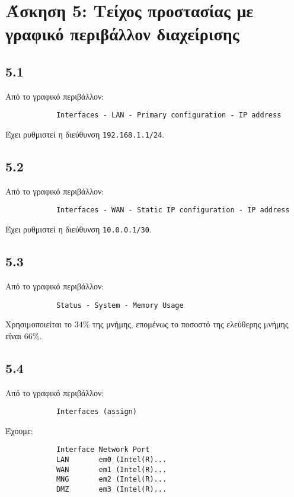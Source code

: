 \documentclass[a4paper, 12pt]{article}
\begin{document}
\section*{Άσκηση 5: Τείχος προστασίας με γραφικό περιβάλλον διαχείρισης}

	\subsection*{5.1}
		Από το γραφικό περιβάλλον:
		
		\begin{verbatim}
			Interfaces - LAN - Primary configuration - IP address 
		\end{verbatim}
		
		Έχει ρυθμιστεί η διεύθυνση \verb|192.168.1.1/24|.

	\subsection*{5.2}
		Από το γραφικό περιβάλλον:
		
		\begin{verbatim}
			Interfaces - WAN - Static IP configuration - IP address
		\end{verbatim}
		
		Έχει ρυθμιστεί η διεύθυνση \verb|10.0.0.1/30|.

	\subsection*{5.3}
		Από το γραφικό περιβάλλον:
		
		\begin{verbatim}
			Status - System - Memory Usage
		\end{verbatim}
		
		Χρησιμοποιείται το 34\% της μνήμης, επομένως το ποσοστό της ελεύθερης μνήμης είναι 66\%.

	\subsection*{5.4}
		Από το γραφικό περιβάλλον:
		
		\begin{verbatim}
			Interfaces (assign)
		\end{verbatim}
		
		Έχουμε:
		
		\begin{verbatim}
			Interface Network Port
			LAN       em0 (Intel(R)...
			WAN       em1 (Intel(R)...
			MNG       em2 (Intel(R)...
			DMZ       em3 (Intel(R)...
		\end{verbatim}
		
\end{document}
